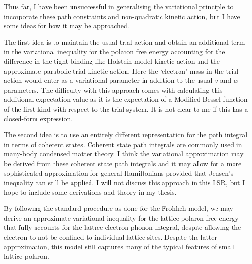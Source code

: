 Thus far, I have been unsuccessful in generalising the variational principle to incorporate these path constraints and non-quadratic kinetic action, but I have some ideas for how it may be approached.
\newline

The first idea is to maintain the usual trial action and obtain an additional term in the variational inequality for the polaron free energy accounting for the difference in the tight-binding-like Holstein model kinetic action and the approximate parabolic trial kinetic action. Here the `electron' mass in the trial action would enter as a variational parameter in addition to the usual $v$ and $w$ parameters. The difficulty with this approach comes with calculating this additional expectation value as it is the expectation of a Modified Bessel function of the first kind with respect to the trial system. It is not clear to me if this has a closed-form expression.
\newline

The second idea is to use an entirely different representation for the path integral in terms of coherent states. Coherent state path integrals are commonly used in many-body condensed matter theory. I think the variational approximation may be derived from these coherent state path integrals and it may allow for a more sophisticated approximation for general Hamiltonians provided that Jensen's inequality can still be applied. I will not discuss this approach in this LSR, but I hope to include some derivations and theory in my thesis.

By following the standard procedure as done for the Fr\"ohlich model, we may derive an approximate variational inequality for the lattice polaron free energy that fully accounts for the lattice electron-phonon integral, despite allowing the electron to not be confined to individual lattice sites. Despite the latter approximation, this model still captures many of the typical features of small lattice polaron.
\newline

